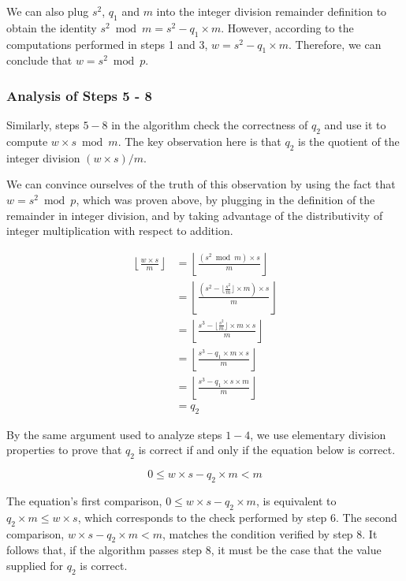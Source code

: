 We can also plug $s^2$, $q_1$ and $m$ into the integer division remainder
definition to obtain the identity $s^2 \bmod m = s^2 - q_1 \times m$. However,
according to the computations performed in steps 1 and 3,
$w = s^2 - q_1 \times m$. Therefore, we can conclude that $w = s^2 \bmod p$.


\subsubsection{Analysis of Steps 5 - 8}

Similarly, steps $5 - 8$ in the algorithm check the correctness of $q_2$ and
use it to compute $w \times s \bmod m$. The key observation here is that
$q_2$ is the quotient of the integer division $(w \times s) / m$.

We can convince ourselves of the truth of this observation by using the fact
that $w = s^2 \bmod p$, which was proven above, by plugging in the definition
of the remainder in integer division, and by taking advantage of the
distributivity of integer multiplication with respect to addition.

\begin{align*}
\left\lfloor \frac{w \times s}{m} \right\rfloor
    & = \left\lfloor \frac{(s^2 \bmod m) \times s}{m} \right\rfloor \\
    & = \left\lfloor \frac{(s^2 - \lfloor \frac{s^2}{m} \rfloor \times m)
        \times s}{m} \right\rfloor \\
    & = \left\lfloor \frac{s^3 - \lfloor \frac{s^2}{m} \rfloor \times m
        \times s}{m} \right\rfloor \\
    & = \left\lfloor \frac{s^3 - q_1 \times m \times s}{m} \right\rfloor \\
    & = \left\lfloor \frac{s^3 - q_1 \times s \times m}{m} \right\rfloor \\
    & = q_2
\end{align*}

By the same argument used to analyze steps $1 - 4$, we use elementary division
properties to prove that $q_2$ is correct if and only if the equation below is
correct.

$$ 0 \le w \times s - q_2 \times m < m $$

The equation's first comparison, $0 \le w \times s - q_2 \times m$, is
equivalent to $q_2 \times m \le w \times s$, which corresponds to the check
performed by step 6. The second comparison, $w \times s - q_2 \times m < m$,
matches the condition verified by step 8. It follows that, if the algorithm
passes step 8, it must be the case that the value supplied for $q_2$ is
correct.

